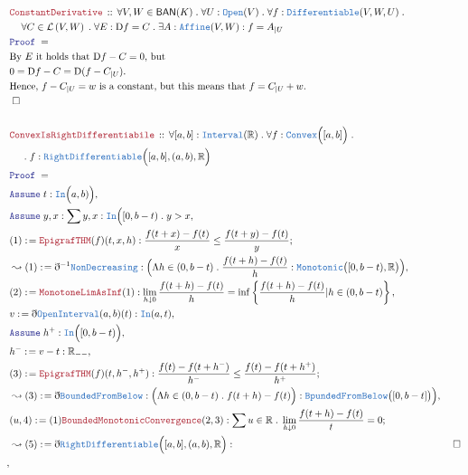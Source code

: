 \documentclass[12pt]{scrartcl}
\newcommand{\TYPE}[1]{\textcolor{NavyBlue}{\mathtt{#1}}}
\newcommand{\LOGIC}[1]{\textcolor{Blue}{\mathtt{#1}}}
\newcommand{\THM}[1]{\textcolor{Maroon}{\mathtt{#1}}}
\renewcommand{\.}{\; . \;}
\newcommand{\de}{: \kern 0.1pc =}
\newcommand{\Theorem}[2]{& \THM{#1} \, :: \, #2 \\ & \Proof = \\ }
\newcommand{\NewLine}{\\ & \kern 1pc}
\newcommand{\Page}[1]{\begin{align*} #1 \end{align*}   }
\newcommand{ \bd }{ \ByDef }
\newcommand{\Reals}{\mathbb{R} }
\newcommand{\Say}[3]{& #1 \de #2 : #3, \\}
\newcommand{\Conclude}[3]{& #1 \de #2 : #3; \\}
\newcommand{\Derive}[3]{& \leadsto #1 \de #2 : #3, \\}
\newcommand{\A}{\LOGIC{Assume} \;}
\newcommand{\Assume}[2]{& \A #1 : #2, \\}
\newcommand{\QED}{\; \square}
\newcommand{\EndProof}{& \QED \\}
\newcommand{\ByDef}{\eth}
\newcommand{\Proof}{\LOGIC{Proof} \; }
\newcommand{\Lin}[1]{\mathcal{L}\left( #1 \right)}
\newcommand{\BAN}{\mathsf{BAN}} %
\newcommand{\D}{\mathrm{D}}
\begin{document}
\Page{
	\Theorem{ConstantDerivative}
	{
		\forall V, W \in \BAN(K) \. 
		\forall U : \TYPE{Open}(V) \.
		\forall f : \TYPE{Differentiable}(V,W,U) \. \NewLine
		\forall C \in \Lin{V,W} \. \forall E : \D f = C \.
		\exists A : \TYPE{Affine}(V,W) : f = A_{|U} 
	}
	& \textrm{By $E$ it holds that $\D f - C = 0$, but } \\
	& 0 = \D f - C = \D ( f -  C_{|U}). \\
	& \textrm{Hence, $f - C_{|U} = w$ is a constant, but this means that $f = C_{|U} + w$.} \\
	\EndProof
	\\
	\Theorem{ConvexIsRightDifferentiabile}
	{
		\forall [a,b] : \TYPE{Interval}(\Reals) \. 
		\forall f : \TYPE{Convex}\Big([a,b]\Big) \.
		\NewLine \. f : \TYPE{RightDifferentiable}\Big([a,b],(a,b), \Reals\Big)
	}
	\Assume{t}{\TYPE{In}\Big(a,b)\Big)}
	\Assume{y,x}{ \sum y,x : \TYPE{In}\Big([0,b - t) \. y > x }
	\Conclude{(1)}{ \THM{EpigrafTHM}(f)(t,x,h)}{ \frac{f(t + x) - f(t) }{x} \le \frac{f(t + y) - f(t) }{y} }
	\Derive{(1)}{\bd^{-1} \TYPE{NonDecreasing}}{ \Big( \Lambda h \in (0,b - t) \. \frac{f(t + h) - f(t)}{h} : \TYPE{Monotonic}\big( [0,b - t), \Reals \big)  \Big)}
	\Say{(2)}{ \THM{MonotoneLimAsInf}(1) }{ \lim_{h \downarrow 0} \frac{f(t + h) - f(t)}{h} = \inf \left\{ \frac{f(t + h) - f(t)}{h} | h \in (0, b - t) \right\}  }
	\Say{v}{\bd \TYPE{OpenInterval}(a,b)(t)}{\TYPE{In}(a,t )}
	\Assume{h^+}{ \TYPE{In}\Big([0,b -t) \Big)  }
	\Say{ h^-}{ v - t   }{\Reals_{--}}
	\Conclude{(3)}{\THM{EpigrafTHM}(f)(t,h^-,h^+)}{ \frac{f(t) - f(t + h^-)}{h^-} \le \frac{f(t) - f(t + h^+)}{h^+} }
	\Derive{(3)}{\bd \TYPE{BoundedFromBelow}}{ \Big( \Lambda h \in (0,b -t) \. f(t + h) - f(t) \Big) : \TYPE{BpundedFromBelow}\big( [0,b - t] \big) \Big)   }
	\Conclude{(u,4)}{ (1)\THM{BoundedMonotonicConvergence}(2,3) }{\sum u \in \Reals \. \lim_{h \downarrow 0} \frac{f(t + h) - f(t)}{t} = 0}
	\Derive{(5)}{\bd \TYPE{RightDifferentiable}\Big([a,b],(a,b),\Reals \Big)}
	\EndProof
}
\end{document}
